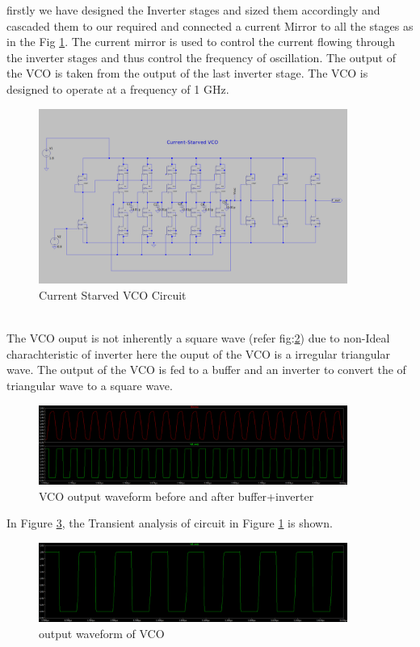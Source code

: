 firstly we have designed the Inverter stages and sized them accordingly and cascaded them to our required and connected a current Mirror to all the stages as in the Fig \ref{fig:vco_circuit}. The current mirror is used to control the current flowing through the inverter stages and thus control the frequency of oscillation. The output of the VCO is taken from the output of the last inverter stage. The VCO is designed to operate at a frequency of 1 GHz.
\begin{figure}[h]
	\centering
	\includegraphics[width=0.9\textwidth]{figs/vco_c.png}
	\caption{Current Starved VCO Circuit}
	\label{fig:vco_circuit}
	\vspace{0.5cm}
\end{figure}\\
The VCO ouput is not inherently a square wave (refer fig:\ref{fig:vco_op_c}) due to non-Ideal charachteristic of inverter here the ouput of the VCO is a irregular triangular wave. The output of the VCO is fed to a buffer and an inverter to convert the  of triangular wave to a square wave.
\begin{figure}
	\centering
	\includegraphics[width=0.9\textwidth]{figs/vco_op_both.png}
	\caption{VCO output waveform before and after buffer+inverter}
	\label{fig:vco_op_c}
	\vspace{0.5cm}
\end{figure}
In Figure \ref{fig:vco_sim}, the Transient analysis of circuit in Figure \ref{fig:vco_circuit} is shown.
\begin{figure}[H]
	\centering
	\includegraphics[width=0.9\textwidth]{figs/vco_op1.png}
	\caption{output waveform of VCO}
	\label{fig:vco_sim}
\end{figure}

